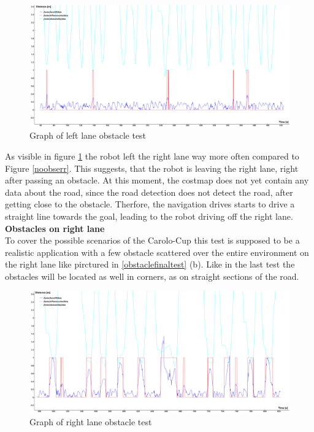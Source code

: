 \begin{figure} 
	\includegraphics[width=\textwidth]{Pictures/left obs final obs2}
	\caption{Graph of left lane obstacle test}
	\label{leftobsfinal}
\end{figure}
As visible in figure \ref{leftobsfinal} the robot left the right lane way more often compared to Figure \ref{noobserr}. This suggests, that the robot is leaving the right lane, right after passing an obstacle. At this moment, the costmap does not yet contain any data about the road, since the road detection does not detect the road, after getting close to the obstacle. Therfore, the navigation drives starts to drive a straight line towards the goal, leading to the robot driving off the right lane.\\

\textbf{Obstacles on right lane}\\

To cover the possible scenarios of the Carolo-Cup this test is supposed to be a realistic application with a few obstacle scattered over the entire environment on the right lane like pirctured in \ref{obstaclefinaltest} (b). Like in the last test the obstacles will be located as well in corners, as on straight sections of the road.

\begin{figure} 
	\includegraphics[width=\textwidth]{Pictures/right obs final obs}
	\caption{Graph of right lane obstacle test}
	\label{rightobsfinal}
\end{figure}


